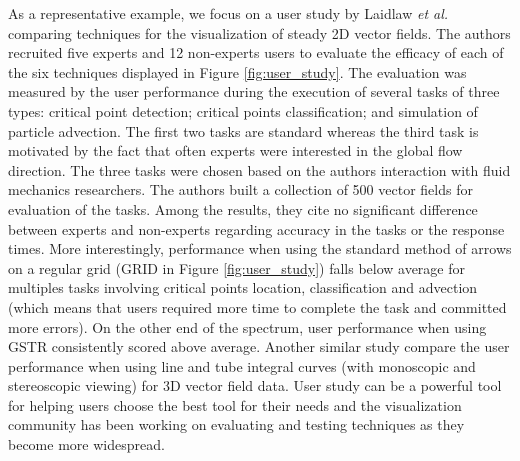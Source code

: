 %

As a representative example, we focus on a user study by Laidlaw \emph{et al.}\cite{Laidlaw:2005:CVF:1032290.1032538} comparing techniques for the visualization of steady 2D vector fields.
The authors recruited five experts and 12 non-experts users to evaluate the efficacy of each of the six techniques displayed in Figure \ref{fig:user_study}. The evaluation was measured by the user performance during the execution of several tasks of three types: critical point detection; critical points classification; and simulation of particle advection. The first two tasks are standard whereas the third task is motivated by the fact that often experts were interested in the global flow direction. The three tasks were chosen based on the authors interaction with fluid mechanics researchers. 
The authors built a collection of 500 vector fields for evaluation of the tasks. Among the results, they cite no significant difference between experts and non-experts regarding accuracy in the tasks or the response times. More interestingly, performance when using the standard method of arrows on a regular grid (GRID in Figure \ref{fig:user_study}) falls below average for multiples tasks involving critical points location, classification and advection (which means that users required more time to complete the task and committed more errors). On the other end of the spectrum, user performance when using GSTR consistently scored above average. Another similar study compare the user performance when using line and tube integral curves (with monoscopic and stereoscopic viewing) for 3D vector field data\cite{Forsberg:2009:CVF:1638611.1639226}. User study can be a powerful tool for helping users choose the best tool for their needs and the visualization community has been working on evaluating and testing techniques as they become more widespread.


